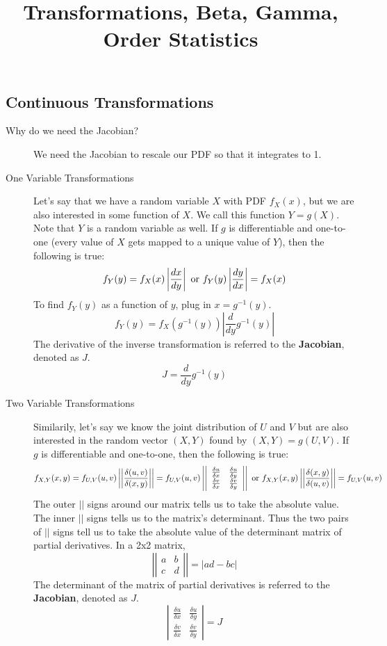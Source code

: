 \documentclass[11.5pt]{article}
\title{Transformations, Beta, Gamma, Order Statistics}
\author{\justin}
\begin{document}
\maketitle

\begin{notes}

\section*{Continuous Transformations}
\begin{description}
	\item[Why do we need the Jacobian?] We need the Jacobian to rescale our PDF so that it integrates to 1.
	\item[One Variable Transformations] Let's say that we have a random variable $X$ with PDF $f_X(x)$, but we are also interested in some function of $X$. We call this function $Y = g(X)$. Note that $Y$ is a random variable as well. If $g$ is differentiable and one-to-one (every value of $X$ gets mapped to a unique value of $Y$), then the following is true:
	\[f_Y(y) = f_X(x)\left|\frac{dx}{dy}\right| \textnormal{ or } f_Y(y) \left|\frac{dy}{dx}\right|= f_X(x)\]
	To find $f_Y(y)$ as a function of $y$, plug in $x = g^{-1}(y)$.
	\[f_Y(y) = f_X(g^{-1}(y))\left|\frac{d}{dy}g^{-1}(y)\right|\]
	The derivative of the inverse transformation is referred to the \textbf{Jacobian}, denoted as $J$.
	\[J = \frac{d}{dy}g^{-1}(y)\]
	\item[Two Variable Transformations] Similarily, let's say we know the joint distribution of $U$ and $V$ but are also interested in the random vector $(X, Y)$ found by $(X, Y) = g(U, V)$. If $g$ is differentiable and one-to-one, then the following is true:
	\[f_{X,Y}(x, y) = f_{U,V}(u,v) \left|\left| \frac{\delta(u, v)}{\delta(x, y)} \right|\right| = f_{U,V}(u,v)\left| \left| 
	\begin{array}{ccc}
		\frac{\delta u}{\delta x} & \frac{\delta u}{\delta y} \\
		\frac{\delta v}{\delta x} & \frac{\delta v}{\delta y} 
	\end{array}
	\right| \right| \textnormal{ or } f_{X,Y}(x, y) \left|\left| \frac{\delta(x, y)}{\delta(u, v)} \right|\right| = f_{U,V}(u,v) 
	\]
	The outer $||$ signs around our matrix tells us to take the absolute value. The inner $||$ signs tells us to the matrix's determinant. Thus the two pairs of $||$ signs tell us to take the absolute value of the determinant matrix of partial derivatives. In a 2x2 matrix, 
	\[ \left| \left|
	\begin{array}{ccc}
		a & b \\
		c & d
	\end{array}
	\right| \right| = |ad - bc|\]
	The determinant of the matrix of partial derivatives is referred to the \textbf{Jacobian}, denoted as $J$.
	\[\left| \begin{array}{ccc}
		\frac{\delta u}{\delta x} & \frac{\delta u}{\delta y} \\
		\frac{\delta v}{\delta x} & \frac{\delta v}{\delta y} 
	\end{array}\right| = J\]


\end{description}
\end{notes}
\end{document}
